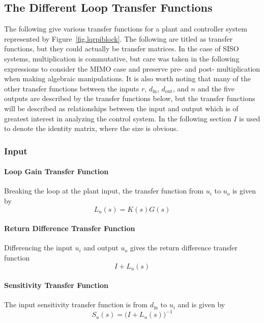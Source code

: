 \subsection{The Different Loop Transfer Functions}

The following give various transfer functions for a plant and controller system represented by Figure~\ref{fig.lqrpiblock}.
The following are titled as transfer functions, but they could actually be transfer matrices.
In the case of SISO systems, multiplication is commutative, but care was taken in the following expressions to consider the MIMO case and preserve pre- and post- multiplication when making algebraic manipulations.
It is also worth noting that many of the other transfer functions between the inputs $r$, $d_{\text{in}}$, $d_{\text{out}}$, and $n$ and the five outputs are described by the transfer functions below, but the transfer functions will be described as relationships between the input and output which is of greatest interest in analyzing the control system.
In the following section $I$ is used to denote the identity matrix, where the size is obvious.

\subsubsection{Input}

\paragraph{Loop Gain Transfer Function}
Breaking the loop at the plant input, the transfer function from $u_{i}$ to $u_{o}$ is given by
\begin{equation}
  L_{u}(s)=K(s)G(s)
\end{equation}

\paragraph{Return Difference Transfer Function}
Differencing the input $u_{i}$ and output $u_{o}$ gives the return difference transfer function
\begin{equation}
  I+L_{u}(s)
\end{equation}

\paragraph{Sensitivity Transfer Function}
The input sensitivity transfer function is from $d_{\text{in}}$ to $u_{i}$ and is given by
\begin{equation}
  S_{u}(s)=\bigr(I+L_{u}(s)\bigr)^{-1}
\end{equation}


